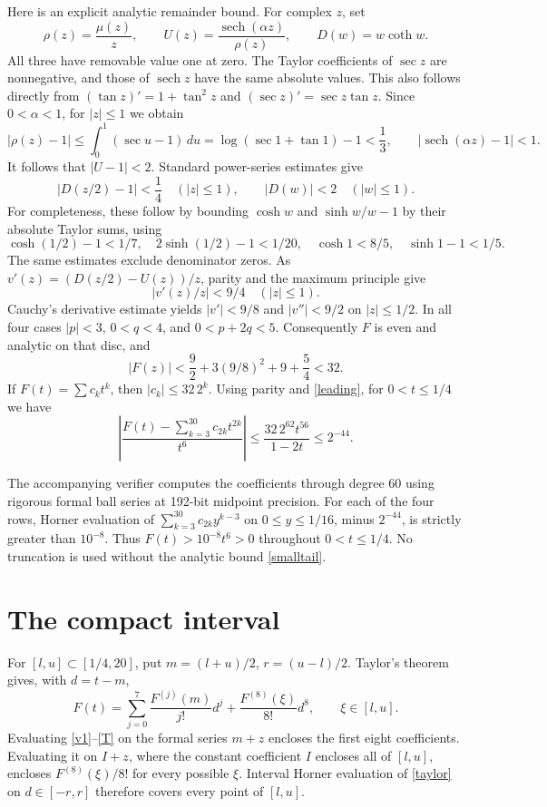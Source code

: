 \documentclass[11pt]{article}
\begin{document}
Here is an explicit analytic remainder bound. For complex \(z\), set
\[
 \rho(z)=\frac{\mu(z)}z,\qquad
 U(z)=\frac{\operatorname{sech}(\alpha z)}{\rho(z)},\qquad
 D(w)=w\coth w.
\]
All three have removable value one at zero. The Taylor coefficients
of \(\sec z\) are nonnegative, and those of \(\operatorname{sech}z\)
have the same absolute values. This also follows directly from
\((\tan z)'=1+\tan^2z\) and \((\sec z)'=\sec z\tan z\).
Since \(0<\alpha<1\), for \(|z|\le1\) we obtain
\[
 |\rho(z)-1|
 \le\int_0^1(\sec u-1)\,du
 =\log(\sec1+\tan1)-1<\frac13,
 \qquad |\operatorname{sech}(\alpha z)-1|<1.
\]
It follows that \(|U-1|<2\). Standard power-series estimates give
\[
 |D(z/2)-1|<\frac14\quad(|z|\le1),\qquad
 |D(w)|<2\quad(|w|\le1).
\]
For completeness, these follow by bounding \(\cosh w\) and
\(\sinh w/w-1\) by their absolute Taylor sums, using
\[
 \cosh(1/2)-1<1/7,\quad 2\sinh(1/2)-1<1/20,\quad
 \cosh1<8/5,\quad \sinh1-1<1/5.
\]
The same estimates exclude denominator zeros. As
\(v'(z)=(D(z/2)-U(z))/z\), parity and the maximum principle give
\[
 |v'(z)/z|<9/4\quad(|z|\le1).
\]
Cauchy's derivative estimate yields \(|v'|<9/8\) and
\(|v''|<9/2\) on \(|z|\le1/2\).
In all four cases \(|p|<3\), \(0<q<4\), and \(0<p+2q<5\).
Consequently \(F\) is even and analytic on that disc, and
\[
 |F(z)|<\frac92+3(9/8)^2+9+\frac54<32.
\]
If \(F(t)=\sum c_k t^k\), then \(|c_k|\le32\,2^k\).
Using parity and \eqref{leading}, for \(0<t\le1/4\) we have
\begin{equation}\label{smalltail}
 \left|\frac{F(t)-\sum_{k=3}^{30}c_{2k}t^{2k}}{t^6}\right|
 \le\frac{32\,2^{62}t^{56}}{1-2t}\le2^{-44}.
\end{equation}

The accompanying verifier computes the coefficients through degree 60
using rigorous formal ball series at 192-bit midpoint precision.
For each of the four rows, Horner evaluation of
\(\sum_{k=3}^{30}c_{2k}y^{k-3}\) on \(0\le y\le1/16\),
minus \(2^{-44}\), is strictly greater than \(10^{-8}\).
Thus \(F(t)>10^{-8}t^6>0\) throughout \(0<t\le1/4\).
No truncation is used without the analytic bound \eqref{smalltail}.

\section*{The compact interval}
For \([l,u]\subset[1/4,20]\), put \(m=(l+u)/2\), \(r=(u-l)/2\).
Taylor's theorem gives, with \(d=t-m\),
\begin{equation}\label{taylor}
 F(t)=\sum_{j=0}^7\frac{F^{(j)}(m)}{j!}d^j
               +\frac{F^{(8)}(\xi)}{8!}d^8,
 \qquad \xi\in[l,u].
\end{equation}
Evaluating \eqref{v1}--\eqref{T} on the formal series \(m+z\)
encloses the first eight coefficients. Evaluating it on \(I+z\),
where the constant coefficient \(I\) encloses all of \([l,u]\),
encloses \(F^{(8)}(\xi)/8!\) for every possible \(\xi\).
Interval Horner evaluation of \eqref{taylor} on \(d\in[-r,r]\)
therefore covers every point of \([l,u]\).
\end{document}
